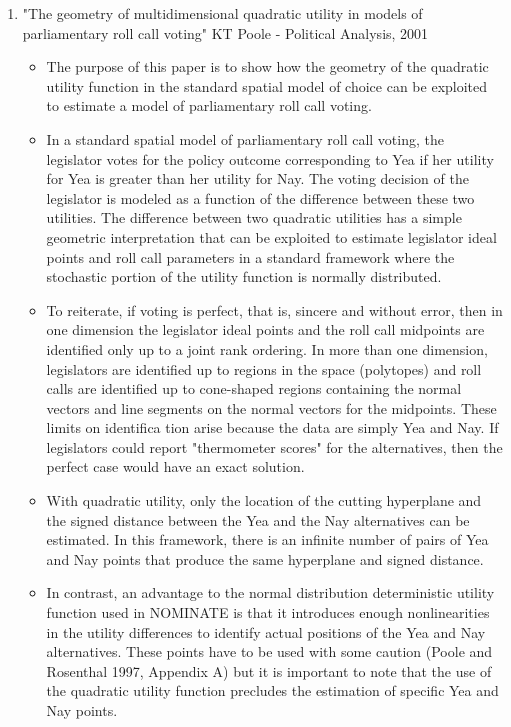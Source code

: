 \documentclass[a4paper,12pt]{article}
\begin{document}
\begin{enumerate}
\item "The geometry of multidimensional quadratic utility in models of parliamentary roll call voting" KT Poole - Political Analysis, 2001
\begin{itemize}
\item The purpose of this paper is to show how the geometry of the quadratic utility function in the standard spatial model of choice can be exploited to estimate a model of parliamentary roll call voting.
\item In a standard spatial model of parliamentary roll call voting, the legislator votes for the policy outcome corresponding to Yea if her utility for Yea is greater than her utility for Nay. The voting decision of the legislator is modeled as a function of the difference between these two utilities. The difference between two quadratic utilities has a simple geometric interpretation that can be exploited to estimate legislator ideal points and roll call parameters in a standard framework where the stochastic portion of the utility function is normally distributed.
\item To reiterate, if voting is perfect, that is, sincere and without error, then in one dimension the legislator ideal points and the roll call midpoints are identified only up to a joint rank ordering. In more than one dimension, legislators are identified up to regions in the space (polytopes) and roll calls are identified up to cone-shaped regions containing the normal vectors and line segments on the normal vectors for the midpoints. These limits on identifica tion arise because the data are simply Yea and Nay. If legislators could report "thermometer scores" for the alternatives, then the perfect case would have an exact solution.
\item With quadratic utility, only the location of the cutting hyperplane and the signed distance between the Yea and the Nay alternatives can be estimated. In this framework, there is an infinite number of pairs of Yea and Nay points that produce the same hyperplane and signed distance. 
\item In contrast, an advantage to the normal distribution deterministic utility function used in NOMINATE is that it introduces enough nonlinearities in the utility differences to identify actual positions of the Yea and Nay alternatives. These points have to be used with some caution (Poole and Rosenthal 1997, Appendix A) but it is important to note that the use of the quadratic utility function precludes the estimation of specific Yea and Nay points.

\end{itemize}
\end{enumerate}
\end{document}
